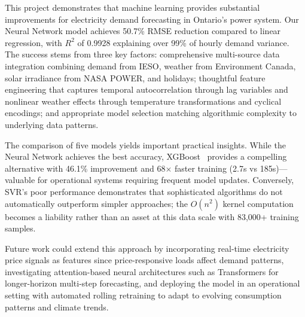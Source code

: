 \documentclass[conference]{IEEEtran}
\begin{document}
This project demonstrates that machine learning provides substantial improvements for electricity demand forecasting in Ontario's power system. Our Neural Network model achieves 50.7\% RMSE reduction compared to linear regression, with $R^2$ of 0.9928 explaining over 99\% of hourly demand variance. The success stems from three key factors: comprehensive multi-source data integration combining demand from IESO, weather from Environment Canada, solar irradiance from NASA POWER, and holidays; thoughtful feature engineering that captures temporal autocorrelation through lag variables and nonlinear weather effects through temperature transformations and cyclical encodings; and appropriate model selection matching algorithmic complexity to underlying data patterns.

The comparison of five models yields important practical insights. While the Neural Network achieves the best accuracy, XGBoost~\cite{xgboost} provides a compelling alternative with 46.1\% improvement and 68$\times$ faster training (2.7s vs 185s)---valuable for operational systems requiring frequent model updates. Conversely, SVR's poor performance demonstrates that sophisticated algorithms do not automatically outperform simpler approaches; the $O(n^2)$ kernel computation becomes a liability rather than an asset at this data scale with 83,000+ training samples.

Future work could extend this approach by incorporating real-time electricity price signals as features since price-responsive loads affect demand patterns, investigating attention-based neural architectures such as Transformers for longer-horizon multi-step forecasting, and deploying the model in an operational setting with automated rolling retraining to adapt to evolving consumption patterns and climate trends.
\end{document}
